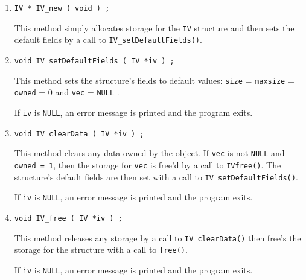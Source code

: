 \begin{enumerate}
\item
\begin{verbatim}
IV * IV_new ( void ) ;
\end{verbatim}
This method simply allocates storage for the {\tt IV} structure 
and then sets the default fields by a call to 
{\tt IV\_setDefaultFields()}.
\item
\begin{verbatim}
void IV_setDefaultFields ( IV *iv ) ;
\end{verbatim}
This method sets the structure's fields to default values:
{\tt size} = {\tt maxsize} = {\tt owned} = 0 
and {\tt vec} = {\tt NULL} .
\par {}
If {\tt iv} is {\tt NULL},
an error message is printed and the program exits.
\item
\begin{verbatim}
void IV_clearData ( IV *iv ) ;
\end{verbatim}
This method clears any data owned by the object.
If {\tt vec} is not {\tt NULL} and {\tt owned = 1},
then the storage for {\tt vec} is free'd by a call to
{\tt IVfree()}.
The structure's default fields are then set 
with a call to {\tt IV\_setDefaultFields()}.
\par {}
If {\tt iv} is {\tt NULL},
an error message is printed and the program exits.
\item
\begin{verbatim}
void IV_free ( IV *iv ) ;
\end{verbatim}
This method releases any storage by a call to 
{\tt IV\_clearData()} then free's the storage for the 
structure with a call to {\tt free()}.
\par {}
If {\tt iv} is {\tt NULL},
an error message is printed and the program exits.
\end{enumerate}
\par
